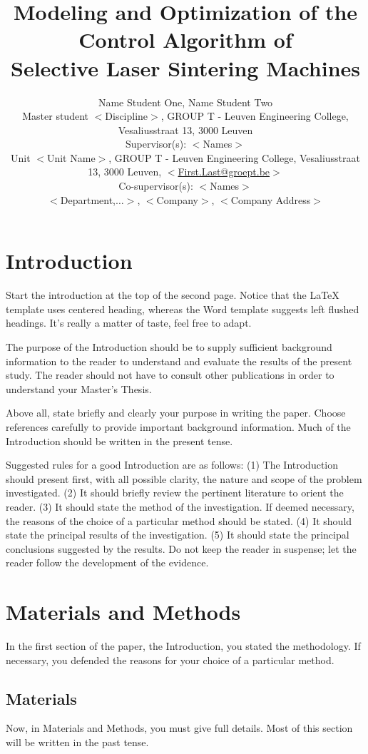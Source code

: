 \documentclass[a4paper]{article}
\title{Modeling and Optimization of the Control Algorithm of\\ Selective Laser Sintering Machines}
\author{Name Student One\supit{*}, Name Student Two\supit{*} \\ \vspace*{0.25cm}
            \small{\supit{*}Master student $<$Discipline$>$, GROUP T - Leuven Engineering College, Vesaliusstraat 13, 3000 Leuven \\ \vspace*{1.5cm}
            Supervisor(s): $<$Names$>$ \\            
            Unit $<$Unit Name$>$, GROUP T - Leuven Engineering College, Vesaliusstraat 13, 3000 Leuven, $<$\href{mailto:First.Last@groept.be}{First.Last@groept.be}$>$} \\ \vspace*{1em}
            Co-supervisor(s): $<$Names$>$\\
            $<$Department,$\ldots>$, $<$Company$>$, $<$Company Address$>$\\
            }
\begin{document}


\twocolumn

\section{Introduction}
\label{sec:intro}
Start the introduction at the top of the second page. Notice that the LaTeX template uses centered heading, whereas the Word template suggests left flushed headings. It's really a matter of taste, feel free to adapt.

The purpose of the Introduction should be to supply sufficient background information to the reader to understand and evaluate the results of the present study. The reader should not have to consult other publications in order to understand your Master's Thesis. 

Above all, state briefly and clearly your purpose in writing the paper. Choose references carefully to provide important background information. Much of the Introduction should be written in the present tense. 

Suggested rules for a good Introduction are as follows: (1) The Introduction should present first, with all possible clarity, the nature and scope of the problem investigated. (2) It should briefly review the pertinent literature to orient the reader. (3) It should state the method of the investigation. If deemed necessary, the reasons of the choice of a particular method should be stated. (4) It should state the principal results of the investigation. (5) It should state the principal conclusions suggested by the results. Do not keep the reader in suspense; let the reader follow the development of the evidence. 

\section{Materials and Methods}
\label{sec:matmeth}
In the first section of the paper, the Introduction, you stated the methodology. If necessary, you defended the reasons for your choice of a particular method.

\subsection{Materials}
Now, in Materials and Methods, you must give full details. Most of this section will be written
in the past tense. 
\end{document}
